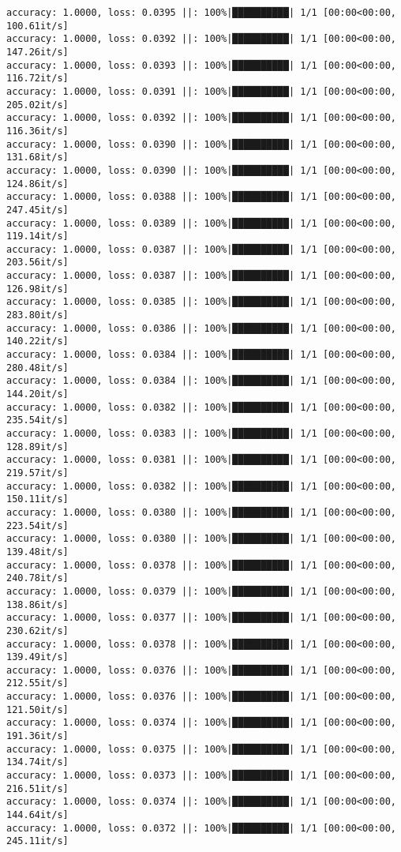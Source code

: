 \documentclass[
]{article}
\begin{document}
\begin{verbatim}
accuracy: 1.0000, loss: 0.0395 ||: 100%|██████████| 1/1 [00:00<00:00, 100.61it/s]
accuracy: 1.0000, loss: 0.0392 ||: 100%|██████████| 1/1 [00:00<00:00, 147.26it/s]
accuracy: 1.0000, loss: 0.0393 ||: 100%|██████████| 1/1 [00:00<00:00, 116.72it/s]
accuracy: 1.0000, loss: 0.0391 ||: 100%|██████████| 1/1 [00:00<00:00, 205.02it/s]
accuracy: 1.0000, loss: 0.0392 ||: 100%|██████████| 1/1 [00:00<00:00, 116.36it/s]
accuracy: 1.0000, loss: 0.0390 ||: 100%|██████████| 1/1 [00:00<00:00, 131.68it/s]
accuracy: 1.0000, loss: 0.0390 ||: 100%|██████████| 1/1 [00:00<00:00, 124.86it/s]
accuracy: 1.0000, loss: 0.0388 ||: 100%|██████████| 1/1 [00:00<00:00, 247.45it/s]
accuracy: 1.0000, loss: 0.0389 ||: 100%|██████████| 1/1 [00:00<00:00, 119.14it/s]
accuracy: 1.0000, loss: 0.0387 ||: 100%|██████████| 1/1 [00:00<00:00, 203.56it/s]
accuracy: 1.0000, loss: 0.0387 ||: 100%|██████████| 1/1 [00:00<00:00, 126.98it/s]
accuracy: 1.0000, loss: 0.0385 ||: 100%|██████████| 1/1 [00:00<00:00, 283.80it/s]
accuracy: 1.0000, loss: 0.0386 ||: 100%|██████████| 1/1 [00:00<00:00, 140.22it/s]
accuracy: 1.0000, loss: 0.0384 ||: 100%|██████████| 1/1 [00:00<00:00, 280.48it/s]
accuracy: 1.0000, loss: 0.0384 ||: 100%|██████████| 1/1 [00:00<00:00, 144.20it/s]
accuracy: 1.0000, loss: 0.0382 ||: 100%|██████████| 1/1 [00:00<00:00, 235.54it/s]
accuracy: 1.0000, loss: 0.0383 ||: 100%|██████████| 1/1 [00:00<00:00, 128.89it/s]
accuracy: 1.0000, loss: 0.0381 ||: 100%|██████████| 1/1 [00:00<00:00, 219.57it/s]
accuracy: 1.0000, loss: 0.0382 ||: 100%|██████████| 1/1 [00:00<00:00, 150.11it/s]
accuracy: 1.0000, loss: 0.0380 ||: 100%|██████████| 1/1 [00:00<00:00, 223.54it/s]
accuracy: 1.0000, loss: 0.0380 ||: 100%|██████████| 1/1 [00:00<00:00, 139.48it/s]
accuracy: 1.0000, loss: 0.0378 ||: 100%|██████████| 1/1 [00:00<00:00, 240.78it/s]
accuracy: 1.0000, loss: 0.0379 ||: 100%|██████████| 1/1 [00:00<00:00, 138.86it/s]
accuracy: 1.0000, loss: 0.0377 ||: 100%|██████████| 1/1 [00:00<00:00, 230.62it/s]
accuracy: 1.0000, loss: 0.0378 ||: 100%|██████████| 1/1 [00:00<00:00, 139.49it/s]
accuracy: 1.0000, loss: 0.0376 ||: 100%|██████████| 1/1 [00:00<00:00, 212.55it/s]
accuracy: 1.0000, loss: 0.0376 ||: 100%|██████████| 1/1 [00:00<00:00, 121.50it/s]
accuracy: 1.0000, loss: 0.0374 ||: 100%|██████████| 1/1 [00:00<00:00, 191.36it/s]
accuracy: 1.0000, loss: 0.0375 ||: 100%|██████████| 1/1 [00:00<00:00, 134.74it/s]
accuracy: 1.0000, loss: 0.0373 ||: 100%|██████████| 1/1 [00:00<00:00, 216.51it/s]
accuracy: 1.0000, loss: 0.0374 ||: 100%|██████████| 1/1 [00:00<00:00, 144.64it/s]
accuracy: 1.0000, loss: 0.0372 ||: 100%|██████████| 1/1 [00:00<00:00, 245.11it/s]

\end{verbatim}
\end{document}
